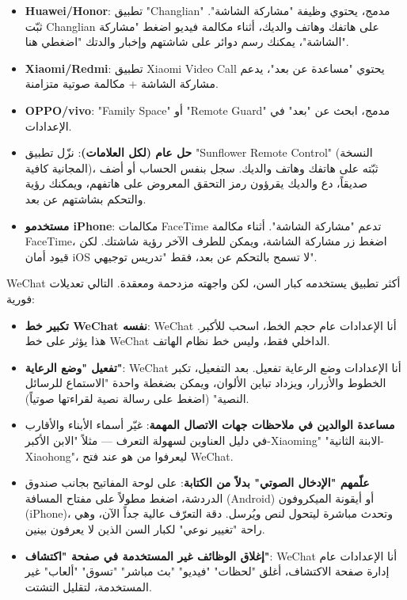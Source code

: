 \begin{itemize}
  \item \textbf{Huawei/Honor}: تطبيق "Changlian" مدمج، يحتوي وظيفة "مشاركة الشاشة". ثبّت Changlian على هاتفك وهاتف والديك، أثناء مكالمة فيديو اضغط "مشاركة الشاشة"، يمكنك رسم دوائر على شاشتهم وإخبار والدتك "اضغطي هنا".
  \item \textbf{Xiaomi/Redmi}: تطبيق Xiaomi Video Call يحتوي "مساعدة عن بعد"، يدعم مشاركة الشاشة + مكالمة صوتية متزامنة.
  \item \textbf{OPPO/vivo}: "Family Space" أو "Remote Guard" مدمج، ابحث عن "بعد" في الإعدادات.
  \item \textbf{حل عام (لكل العلامات)}: نزّل تطبيق "Sunflower Remote Control" (النسخة المجانية كافية)، ثبّته على هاتفك وهاتف والديك. سجل بنفس الحساب أو أضف صديقاً، دع والديك يقرؤون رمز التحقق المعروض على هاتفهم، ويمكنك رؤية والتحكم بشاشتهم عن بعد.
  \item \textbf{مستخدمو iPhone}: مكالمات FaceTime تدعم "مشاركة الشاشة". أثناء مكالمة FaceTime، اضغط زر مشاركة الشاشة، ويمكن للطرف الآخر رؤية شاشتك. لكن قيود أمان iOS لا تسمح بالتحكم عن بعد، فقط "تدريس توجيهي".
\end{itemize}


WeChat أكثر تطبيق يستخدمه كبار السن، لكن واجهته مزدحمة ومعقدة. التالي تعديلات فورية:

\begin{itemize}
  \item \textbf{تكبير خط WeChat نفسه}: WeChat أنا الإعدادات عام حجم الخط، اسحب للأكبر. هذا يؤثر على خط WeChat الداخلي فقط، وليس خط نظام الهاتف.
  \item \textbf{تفعيل "وضع الرعاية"}: WeChat أنا الإعدادات وضع الرعاية تفعيل. بعد التفعيل، تكبر الخطوط والأزرار، ويزداد تباين الألوان، ويمكن بضغطة واحدة "الاستماع للرسائل النصية" (اضغط على رسالة نصية لقراءتها صوتياً).
  \item \textbf{مساعدة الوالدين في ملاحظات جهات الاتصال المهمة}: غيّر أسماء الأبناء والأقارب في دليل العناوين لسهولة التعرف — مثلاً "الابن الأكبر-Xiaoming" "الابنة الثانية-Xiaohong"، ليعرفوا من هو عند فتح WeChat.
  \item \textbf{علّمهم "الإدخال الصوتي" بدلاً من الكتابة}: على لوحة المفاتيح بجانب صندوق الدردشة، اضغط مطولاً على مفتاح المسافة (Android) أو أيقونة الميكروفون (iPhone)، وتحدث مباشرة ليتحول لنص ويُرسل. دقة التعرّف عالية جداً الآن، وهي راحة "تغيير نوعي" لكبار السن الذين لا يعرفون بينين.
  \item \textbf{إغلاق الوظائف غير المستخدمة في صفحة "اكتشاف"}: WeChat أنا الإعدادات عام إدارة صفحة الاكتشاف، أغلق "لحظات" "فيديو" "بث مباشر" "تسوق" "ألعاب" غير المستخدمة، لتقليل التشتت.
\end{itemize}

